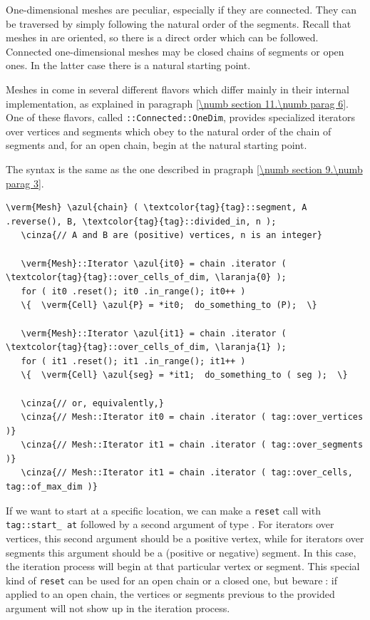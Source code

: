 One-dimensional meshes are peculiar, especially if they are connected.
They can be traversed by simply following the natural order of the segments.
Recall that meshes in {\maniFEM} are oriented, so there is a direct order which can be followed.
Connected one-dimensional meshes may be closed chains of segments or open ones.
In the latter case there is a natural starting point.

Meshes in {\maniFEM} come in several different flavors which differ mainly in their internal
implementation, as explained in paragraph \ref{\numb section 11.\numb parag 6}.
One of these flavors, called {\small\tt {}::Connected::OneDim}, provides specialized iterators
over vertices and segments which obey to the natural order of the chain of segments and,
for an open chain, begin at the natural starting point.

The syntax is the same as the one described in pragraph \ref{\numb section 9.\numb parag 3}.

\begin{Verbatim}[commandchars=\\\{\},formatcom=\small\tt,
   baselinestretch=0.94,framesep=2mm                      ]
   \verm{Mesh} \azul{chain} ( \textcolor{tag}{tag}::segment, A .reverse(), B, \textcolor{tag}{tag}::divided_in, n );
   \cinza{// A and B are (positive) vertices, n is an integer}
   
   \verm{Mesh}::Iterator \azul{it0} = chain .iterator ( \textcolor{tag}{tag}::over_cells_of_dim, \laranja{0} );
   for ( it0 .reset(); it0 .in_range(); it0++ )
   \{  \verm{Cell} \azul{P} = *it0;  do_something_to (P);  \}

   \verm{Mesh}::Iterator \azul{it1} = chain .iterator ( \textcolor{tag}{tag}::over_cells_of_dim, \laranja{1} );
   for ( it1 .reset(); it1 .in_range(); it1++ )
   \{  \verm{Cell} \azul{seg} = *it1;  do_something_to ( seg );  \}
   
   \cinza{// or, equivalently,}
   \cinza{// Mesh::Iterator it0 = chain .iterator ( tag::over_vertices )}
   \cinza{// Mesh::Iterator it1 = chain .iterator ( tag::over_segments )}
   \cinza{// Mesh::Iterator it1 = chain .iterator ( tag::over_cells, tag::of_max_dim )}
\end{Verbatim}

If we want to start at a specific location, we can make a {\small\tt reset} call with
{\small\tt \textcolor{tag}{tag}::start\_\,at} followed by a second argument of type {\small\tt{}}.
For iterators over vertices, this second argument should be a positive vertex,
while for iterators over segments this argument should be a (positive or negative) segment.
In this case, the iteration process will begin at that particular vertex or segment.
This special kind of {\small\tt reset} can be used for an open chain or a closed one,
but beware$\;$: if applied to an open chain, the vertices or segments previous to the provided
argument will not show up in the iteration process.

